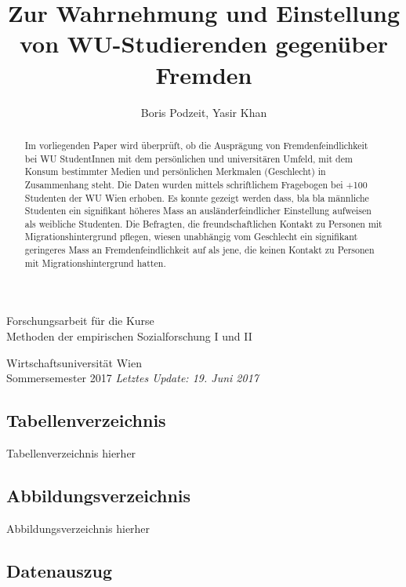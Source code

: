 \documentclass[]{article}
\title{Zur Wahrnehmung und Einstellung von WU-Studierenden gegenüber Fremden}
\author{Boris Podzeit, Yasir Khan}
\date{}
\begin{document}
\maketitle

\begin{center}
\vspace{5mm}
Forschungsarbeit für die Kurse\\
Methoden der empirischen Sozialforschung I und II \par
\vspace{5mm}
Wirtschaftsuniversität Wien\\
Sommersemester 2017
\vfill
\textit {Letztes Update: 19. Juni 2017}
\end{center}

\clearpage

\begin{abstract}
Im vorliegenden Paper wird überprüft, ob die Ausprägung von Fremdenfeindlichkeit bei WU StudentInnen mit dem persönlichen und universitären Umfeld, mit dem Konsum bestimmter Medien und persönlichen Merkmalen (Geschlecht) in Zusammenhang steht. Die Daten wurden mittels schriftlichem Fragebogen bei +100 Studenten der WU Wien erhoben. Es konnte gezeigt werden dass, bla bla männliche Studenten ein signifikant höheres Mass an ausländerfeindlicher Einstellung aufweisen als weibliche Studenten. Die Befragten, die freundschaftlichen Kontakt zu Personen mit Migrationshintergrund pflegen, wiesen unabhängig vom Geschlecht ein signifikant geringeres Mass an Fremdenfeindlichkeit auf als jene, die keinen Kontakt zu Personen mit Migrationshintergrund hatten. 
\end{abstract}

\renewcommand*\contentsname{Inhaltsverzeichnis}

\tableofcontents

\subsection{Tabellenverzeichnis}\label{tabellenverzeichnis}

Tabellenverzeichnis hierher

\subsection{Abbildungsverzeichnis}\label{abbildungsverzeichnis}

Abbildungsverzeichnis hierher

\subsection{Datenauszug}\label{datenauszug}
\end{document}
